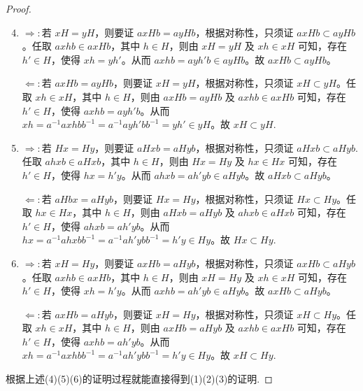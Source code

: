 \documentclass[../../main.tex]{subfiles}
\begin{document}
\begin{proof}
\begin{enumerate}[(1)]\setcounter{enumi}{3}
\item $\Rightarrow:$若 \(xH = yH\)，则要证 \(axHb = ayHb\)，根据对称性，只须证 \(axHb \subset ayHb\)。任取 \(axhb \in axHb\)，其中 \(h \in H\)，则由 \(xH = yH\) 及 \(xh \in xH\) 可知，存在 \(h' \in H\)，使得 \(xh = yh'\)。从而 \(axhb = ayh'b \in ayHb\)。故 \(axHb \subset ayHb\)。

$\Leftarrow:$若 \(axHb = ayHb\)，则要证 \(xH = yH\)，根据对称性，只须证 \(xH \subset yH\)。任取 \(xh \in xH\)，其中 \(h \in H\)，则由 \(axHb = ayHb\) 及 \(axhb \in axHb\) 可知，存在 \(h' \in H\)，使得 \(axhb = ayh'b\)。从而 \(xh = a^{-1}axhbb^{-1} = a^{-1}ayh'bb^{-1} = yh' \in yH\)。故 \(xH \subset yH\).

\item $\Rightarrow:$若 \(Hx = Hy\)，则要证 \(aHxb = aHyb\)，根据对称性，只须证 \(aHxb \subset aHyb\).任取 \(ahxb \in aHxb\)，其中 \(h \in H\)，则由 \(Hx = Hy\) 及 \(hx \in Hx\) 可知，存在 \(h' \in H\)，使得 \(hx = h'y\)。从而 \(ahxb = ah'yb \in aHyb\)。故 \(aHxb \subset aHyb\)。

$\Leftarrow:$若 \(aHbx = aHyb\)，则要证 \(Hx = Hy\)，根据对称性，只须证 \(Hx \subset Hy\)。任取 \(hx \in Hx\)，其中 \(h \in H\)，则由 \(aHxb = aHyb\) 及 \(ahxb \in aHxb\) 可知，存在 \(h' \in H\)，使得 \(ahxb = ah'yb\)。从而 \(hx = a^{-1}ahxbb^{-1} = a^{-1}ah'ybb^{-1} = h'y \in Hy\)。故 \(Hx \subset Hy\).

\item $\Rightarrow:$若 \(xH = Hy\)，则要证 \(axHb = aHyb\)，根据对称性，只须证 \(axHb \subset aHyb\)。任取 \(axhb \in axHb\)，其中 \(h \in H\)，则由 \(xH = Hy\) 及 \(xh \in xH\) 可知，存在 \(h' \in H\)，使得 \(xh = h'y\)。从而 \(axhb = ah'yb \in aHyb\)。故 \(axHb \subset aHyb\)。

$\Leftarrow:$若 \(axHb = aHyb\)，则要证 \(xH = Hy\)，根据对称性，只须证 \(xH \subset Hy\)。任取 \(xh \in xH\)，其中 \(h \in H\)，则由 \(axHb = aHyb\) 及 \(axhb \in axHb\) 可知，存在 \(h' \in H\)，使得 \(axhb = ah'yb\)。从而 \(xh = a^{-1}axhbb^{-1} = a^{-1}ah'ybb^{-1} = h'y \in Hy\)。故 \(xH \subset Hy\).
\end{enumerate}

根据上述(4)(5)(6)的证明过程就能直接得到(1)(2)(3)的证明.
\end{proof}
\end{document}
